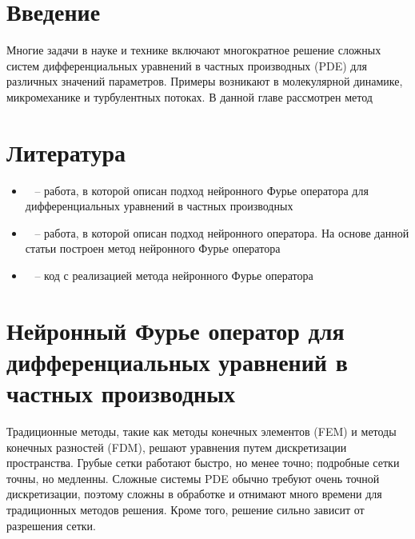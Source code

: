 \section{Введение}

Многие задачи в науке и технике включают многократное решение сложных систем дифференциальных уравнений в частных производных (PDE) для различных значений параметров. Примеры возникают в молекулярной динамике, микромеханике и турбулентных потоках. В данной главе рассмотрен метод 

\section{Литература}

	\begin{itemize}
		\item ~\cite{FNO} --  работа, в которой описан подход нейронного Фурье оператора для  дифференциальных уравнений в частных производных
		\item ~\cite{Deeponet} -- работа, в которой описан подход нейронного оператора. На основе данной статьи построен метод нейронного Фурье оператора
		\item ~\cite{FNOcode} -- код с реализацией метода нейронного Фурье оператора 
	\end{itemize}


\section{Нейронный Фурье оператор для дифференциальных уравнений в частных производных}

Традиционные методы, такие как методы конечных элементов (FEM) и методы конечных разностей (FDM), решают уравнения путем дискретизации пространства. Грубые сетки работают быстро, но менее точно; подробные сетки точны, но медленны. Сложные системы PDE обычно требуют очень точной дискретизации, поэтому сложны в обработке и отнимают много времени для традиционных методов решения. Кроме того, решение сильно зависит от разрешения сетки.


